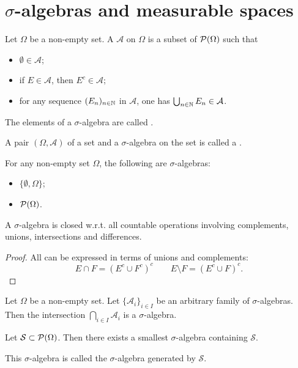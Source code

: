 \section{$\sigma$-algebras and measurable spaces}
\begin{definition}
Let $\Omega$ be a non-empty set. A  $\mathcal{A}$ on $\Omega$ is a subset of $\operatorname{\mathcal{P}}(\Omega)$ such that
\begin{itemize}
\item $\emptyset \in \mathcal{A}$;
\item if $E\in \mathcal{A}$, then $E^c\in \mathcal{A}$;
\item for any sequence $(E_n)_{n\in\mathbb{N}}$ in $\mathcal{A}$, one has $\bigcup_{n\in\mathbb{N}}E_n \in \mathcal{A}$.
\end{itemize}
The elements of a $\sigma$-algebra are called .

A pair $(\Omega, \mathcal{A})$ of a set and a $\sigma$-algebra on the set is called a .
\end{definition}

\begin{example}
For any non-empty set $\Omega$, the following are $\sigma$-algebras:
\begin{itemize}
\item $\{\emptyset, \Omega\}$;
\item $\operatorname{\mathcal{P}}(\Omega)$.
\end{itemize}
\end{example}

\begin{lemma}
A $\sigma$-algebra is closed w.r.t. all countable operations involving complements, unions, intersections and differences.
\end{lemma}
\begin{proof}
All can be expressed in terms of unions and complements:
\[ E\cap F = (E^c\cup F^c)^c\qquad E\setminus F = (E^c\cup F)^c. \]
\end{proof}

\begin{lemma}
Let $\Omega$ be a non-empty set. Let $\{\mathcal{A}_i\}_{i\in I}$ be an arbitrary family of $\sigma$-algebras. Then the intersection $\bigcap_{i\in I}\mathcal{A}_i$ is a $\sigma$-algebra.
\end{lemma}
\begin{corollary}
Let $\mathcal{S}\subset \operatorname{\mathcal{P}}(\Omega)$. Then there exists a smallest $\sigma$-algebra containing $\mathcal{S}$.
\end{corollary}
This $\sigma$-algebra is called the $\sigma$-algebra generated by $\mathcal{S}$.


